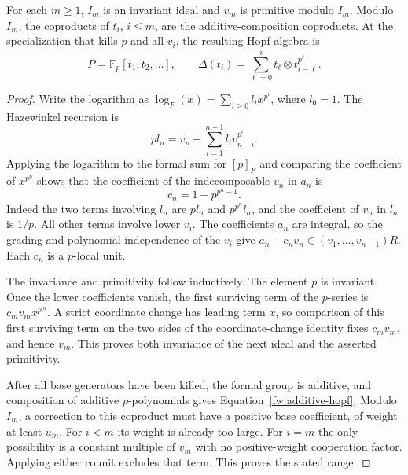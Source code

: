 \begin{lemma}
\label{fw:coordinates}
For each $m\geq 1$, $I_m$ is an invariant ideal and $v_m$ is primitive
modulo $I_m$.  Modulo $I_m$, the coproducts of $t_i$, $i\leq m$, are the
additive-composition coproducts.  At the specialization that kills $p$ and
all $v_i$, the resulting Hopf algebra is
\begin{equation}
 P=\mathbb F_p[t_1,t_2,\ldots],\qquad
 \Delta(t_i)=\sum_{\ell=0}^i t_\ell\otimes t_{i-\ell}^{p^\ell}.
 \label{fw:additive-hopf}
\end{equation}
\end{lemma}

\begin{proof}
Write the logarithm as $\log_F(x)=\sum_{i\geq0}l_i x^{p^i}$, where $l_0=1$.
The Hazewinkel recursion is
\[
 pl_n=v_n+\sum_{i=1}^{n-1}l_i v_{n-i}^{p^i}.
\]
Applying the logarithm to the formal sum for $[p]_F$ and comparing the
coefficient of $x^{p^n}$ shows that the coefficient of the indecomposable
$v_n$ in $a_n$ is
\begin{equation}
 c_n=1-p^{p^n-1}.
 \label{fw:coordinate-unit}
\end{equation}
Indeed the two terms involving $l_n$ are $pl_n$ and $p^{p^n}l_n$, and the
coefficient of $v_n$ in $l_n$ is $1/p$.  All other terms involve lower
$v_i$.  The coefficients $a_n$ are integral, so the grading and polynomial
independence of the $v_i$ give
$a_n-c_nv_n\in(v_1,\ldots,v_{n-1})R$.  Each $c_n$ is a $p$-local unit.

The invariance and primitivity follow inductively.  The element $p$ is
invariant.  Once the lower coefficients vanish, the first surviving term
of the $p$-series is $c_m v_m x^{p^m}$.  A strict coordinate change has
leading term $x$, so comparison of this first surviving term on the two
sides of the coordinate-change identity fixes $c_m v_m$, and hence $v_m$.
This proves both invariance of the next ideal and the asserted primitivity.

After all base generators have been killed, the formal group is additive,
and composition of additive $p$-polynomials gives
Equation~\eqref{fw:additive-hopf}.  Modulo $I_m$, a correction to this
coproduct must have a positive base coefficient, of weight at least $u_m$.
For $i<m$ its weight is already too large.  For $i=m$ the only possibility
is a constant multiple of $v_m$ with no positive-weight cooperation factor.
Applying either counit excludes that term.  This proves the stated range.
\end{proof}

